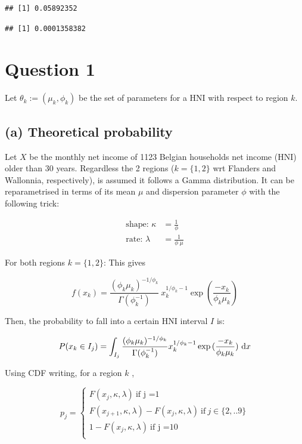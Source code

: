 \documentclass[a4paper, 12pt]{article}
\begin{document}
\begin{verbatim}
## [1] 0.05892352
\end{verbatim}

\begin{verbatim}
## [1] 0.0001358382
\end{verbatim}

    \hypertarget{question-1}{%
    \section{Question 1}\label{question-1}}

    Let \(\theta_k:= (\mu_k, \phi_k)\) be the set of parameters for a
    HNI with respect to region \(k\).

    \hypertarget{a-theoretical-probability}{%
    \subsection{(a) Theoretical
    probability}\label{a-theoretical-probability}}

    Let \(X\) be the monthly net income of 1123 Belgian households net
    income (HNI) older than 30 years. Regardless the 2 regions
    (\(k=\{1,2\}\) wrt Flanders and Wallonnia, respectively), is assumed
    it follows a Gamma distribution. It can be reparametrised in terms
    of its mean \(\mu\) and dispersion parameter \(\phi\) with the
    following trick:

    \[
    \begin{split}
    \text{shape: } \kappa & = \frac{1}{\phi} \\
    \text{rate: } \lambda & = \frac{1}{\phi\; \mu}
    \end{split}
    \]

    For both regions \(k=\{1,2\}\): This gives

    \[
    f(x_k) = \frac{(\phi_k\mu_k)^{-1/\phi_k}}{\Gamma(\phi_k^{-1})} \
    x_k^{1/\phi_k-1} \exp{(\frac{-x_k}{\phi_k \mu_k})}
    \]

    Then, the probability to fall into a certain HNI interval \(I\) is:

    \[
    P( x_k \in I_j) =\int_{I_j} \frac{(\phi_k \mu_k)^{-1/\phi_k}}{\Gamma(\phi_k^{-1})} x_k^{1/\phi_k-1} \exp{(\frac{-x_k}{\phi_k \mu_k})}\ \mathrm{d}{x}
    \]

    Using CDF writing, for a region \(k\) ,

    \[
    p_j =
    \begin{cases}
     F(x_{j}, \kappa, \lambda) \ \text{if j =1}\\
     F(x_{j+1}, \kappa, \lambda) - F(x_{j}, \kappa, \lambda) \ \text{if} \ j \in \{2,..9\}\\
     1 - F(x_{j}, \kappa, \lambda) \ \text{if j =10}\\
    \end{cases}
    \]
\end{document}
